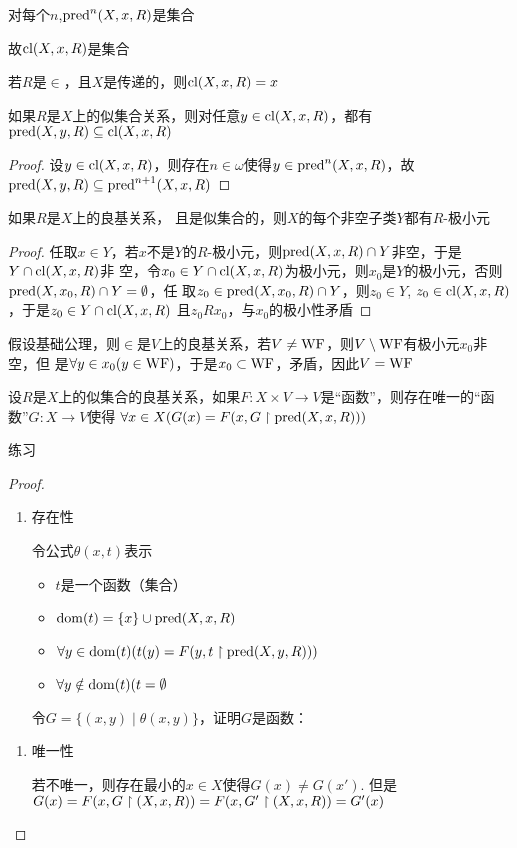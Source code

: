 \documentclass[11pt]{article}
\begin{document}
对每个\(n\),\(\text{pred}^n(X,x,R)\)是集合

故\(\operatorname{\text{cl}}(X,x,R)\)是集合

若\(R\)是\(\in\)，且\(X\)是传递的，则\(\operatorname{\text{cl}}(X,x,R)=x\)


\begin{lemma}[]
如果\(R\)是\(X\)上的似集合关系，则对任意\(y\in\operatorname{\text{cl}}(X,x,R)\)，都有\(\text{pred}(X,y,R)\subseteq\operatorname{\text{cl}}(X,x,R)\)
\end{lemma}

\begin{proof}
设\(y\in\operatorname{\text{cl}}(X,x,R)\)，则存在\(n\in\omega\)使得\(y\in\text{pred}^n(X,x,R)\)，故\(\text{pred}(X,y,R)\subseteq\text{pred}^{n+1}(X,x,R)\)
\end{proof}

\begin{theorem}[]
如果\(R\)是\(X\)上的良基关系， 且是似集合的，则\(X\)的每个非空子类\(Y\)都有\(R\)-极小元
\end{theorem}

\begin{proof}
任取\(x\in Y\)，若\(x\)不是\(Y\)的\(R\)-极小元，则\(\text{pred}(X,x,R)\cap Y\)非空，于是\(Y\cap\operatorname{\text{cl}}(X,x,R)\)非
空，令\(x_0\in Y\cap\operatorname{\text{cl}}(X,x,R)\)为极小元，则\(x_0\)是\(Y\)的极小元，否则\(\text{pred}(X,x_0,R)\cap Y=\emptyset\)，任
取\(z_0\in\text{pred}(X,x_0,R)\cap Y\)，则\(z_0\in Y\), \(z_0\in\operatorname{\text{cl}}(X,x,R)\)，于是\(z_0\in Y\cap\operatorname{\text{cl}}(X,x,R)\)
且\(z_0Rx_0\)，与\(x_0\)的极小性矛盾
\end{proof}

\begin{remark}
假设基础公理，则\(\in\)是\(V\)上的良基关系，若\(V\neq\operatorname{WF}\)，则\(V\setminus\operatorname{WF}\)有极小元\(x_0\)非空，但
是\(\forall y\in x_0(y\in\operatorname{WF})\)，于是\(x_0\subset\operatorname{WF}\)，矛盾，因此\(V=\operatorname{WF}\)
\end{remark}

\begin{theorem}[]
设\(R\)是\(X\)上的似集合的良基关系，如果\(F:X\times V\to V\)是“函数”，则存在唯一的“函数”\(G:X\to V\)使得
\(\forall x\in X(G(x)=F(x, G\upharpoonright\text{pred}(X,x,R)))\)
\end{theorem}

练习
\begin{proof}
\begin{enumerate}
\item 存在性

令公式\(\theta(x,t)\)表示
\begin{itemize}
\item \(t\)是一个函数（集合）
\item \(\operatorname{dom}(t)=\{x\}\cup\text{pred}(X,x,R)\)
\item \(\forall y\in\operatorname{dom}(t)(t(y)=F(y,t\upharpoonright\text{pred}(X,y,R)))\)
\item \(\forall y\notin\operatorname{dom}(t)(t=\emptyset\)
\end{itemize}
令\(G=\{(x,y)\mid\theta(x,y)\}\)，证明\(G\)是函数：
\end{enumerate}


\begin{enumerate}
\item 唯一性

若不唯一，则存在最小的\(x\in X\)使得\(G(x)\neq G(x')\). 但是\(G(x)=F(x,G\upharpoonright(X,x,R))=F(x,G'\upharpoonright(X,x,R))=G'(x)\)
\end{enumerate}
\end{proof}
\end{document}
